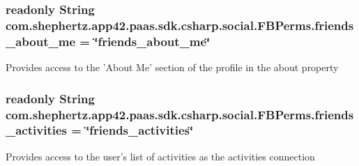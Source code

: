 \hypertarget{classcom_1_1shephertz_1_1app42_1_1paas_1_1sdk_1_1csharp_1_1social_1_1_f_b_perms_a18531647630e04937ac3fd7d0f5876e7}{
\subsubsection[{friends\+\_\+about\+\_\+me}]{\setlength{\rightskip}{0pt plus 5cm}readonly String com.\+shephertz.\+app42.\+paas.\+sdk.\+csharp.\+social.\+F\+B\+Perms.\+friends\+\_\+about\+\_\+me = \char`\"{}friends\+\_\+about\+\_\+me\char`\"{}\hspace{0.3cm}{\ttfamily [static]}}}\label{classcom_1_1shephertz_1_1app42_1_1paas_1_1sdk_1_1csharp_1_1social_1_1_f_b_perms_a18531647630e04937ac3fd7d0f5876e7}


Provides access to the 'About Me' section of the profile in the about property 

\hypertarget{classcom_1_1shephertz_1_1app42_1_1paas_1_1sdk_1_1csharp_1_1social_1_1_f_b_perms_adc8673242ebbcff0f99ef552fdc83755}{
\subsubsection[{friends\+\_\+activities}]{\setlength{\rightskip}{0pt plus 5cm}readonly String com.\+shephertz.\+app42.\+paas.\+sdk.\+csharp.\+social.\+F\+B\+Perms.\+friends\+\_\+activities = \char`\"{}friends\+\_\+activities\char`\"{}\hspace{0.3cm}{\ttfamily [static]}}}\label{classcom_1_1shephertz_1_1app42_1_1paas_1_1sdk_1_1csharp_1_1social_1_1_f_b_perms_adc8673242ebbcff0f99ef552fdc83755}


Provides access to the user's list of activities as the activities connection 

